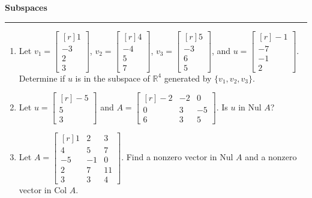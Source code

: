 \documentclass[12pt]{article}
\begin{document}
\begin{center}
{\bf \Large Subspaces}
\vspace{0.2cm}
\hrule
\end{center}

\begin{multicols*}{2}
	\begin{enumerate}
		\item Let $v_1 = \begin{bmatrix*}[r]
			1\\-3\\2\\3
		\end{bmatrix*}$, $v_2 = \begin{bmatrix*}[r]
			4\\-4\\5\\7
		\end{bmatrix*}$, $v_3 = \begin{bmatrix*}[r]
			5\\-3\\6\\5
		\end{bmatrix*}$, and $u = \begin{bmatrix*}[r]
			-1\\-7\\-1\\2
		\end{bmatrix*}$. Determine if $u$ is in the subspace of $\mathbb{R}^4$ generated by $\{v_1, v_2, v_3\}$.

		\vfill

		\item Let $u = \begin{bmatrix*}[r]
			-5\\5\\3
		\end{bmatrix*}$ and $A = \begin{bmatrix*}[r]
			-2 & -2 & 0\\
			0 & 3 & -5\\
			6 & 3 & 5
		\end{bmatrix*}$. Is $u$ in Nul $A$?

		\vfill

		\item Let $A = \begin{bmatrix*}[r]
			1 & 2 & 3\\
			4 & 5 & 7\\
			-5 & -1 & 0\\
			2 & 7 & 11\\
			3 & 3 & 4
		\end{bmatrix*}$. Find a nonzero vector in Nul $A$ and a nonzero vector in Col $A$.


\end{enumerate}
\end{multicols*}
\end{document}
